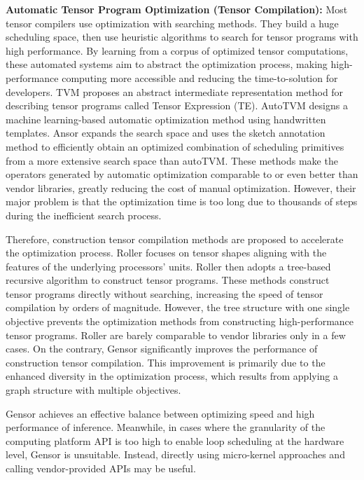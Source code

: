 \textbf{Automatic Tensor Program Optimization (Tensor Compilation): }Most tensor compilers use optimization with searching methods\cite{dong2023akgf}. They build a huge scheduling space, then use heuristic algorithms to search for tensor programs with high performance. By learning from a corpus of optimized tensor computations, these automated systems aim to abstract the optimization process, making high-performance computing more accessible and reducing the time-to-solution for developers. TVM proposes an abstract intermediate representation method for describing tensor programs called Tensor Expression (TE)\cite{chen2018tvm}. 
AutoTVM designs a machine learning-based automatic optimization method using handwritten templates\cite{chen2018learning}. Ansor expands the search space and uses the sketch annotation method to efficiently obtain an optimized combination of scheduling primitives from a more extensive search space than autoTVM\cite{zheng2020ansor}. 
These methods make the operators generated by automatic optimization comparable to or even better than vendor libraries, greatly reducing the cost of manual optimization. However, their major problem is that the optimization time is too long due to thousands of steps during the inefficient search process.

Therefore, construction tensor compilation methods are proposed to accelerate the optimization process. Roller focuses on tensor shapes aligning with the features of the underlying processors' units. Roller then adopts a tree-based recursive algorithm to construct tensor programs\cite{zhu2022roller}. These methods construct tensor programs directly without searching, increasing the speed of tensor compilation by orders of magnitude. However, the tree structure with one single objective prevents the optimization methods from constructing high-performance tensor programs. Roller are barely comparable to vendor libraries only in a few cases.
On the contrary, Gensor significantly improves the performance of construction tensor compilation. This improvement is primarily due to the enhanced diversity in the optimization process, which results from applying a graph structure with multiple objectives.


Gensor achieves an effective balance between optimizing speed and high performance of inference. Meanwhile, in cases where the granularity of the computing platform API is too high to enable loop scheduling at the hardware level, Gensor is unsuitable. Instead, directly using micro-kernel approaches and calling vendor-provided APIs may be useful.